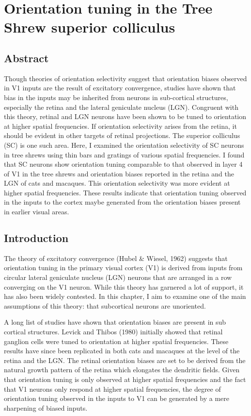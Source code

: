 
	\chapter{Orientation tuning in the Tree Shrew superior colliculus}
	\pagebreak
	\section{Abstract}
	
	Though theories of orientation selectivity suggest that orientation biases observed in V1 inputs are the result of excitatory convergence, studies have shown that bias in the inputs may be inherited from neurons in sub-cortical structures, especially the retina and the lateral geniculate nucleus (LGN). Congruent with this theory, retinal and LGN neurons have been shown to be tuned to orientation at higher spatial frequencies. If orientation selectivity arises from the retina, it should be evident in other targets of retinal projections. The superior colliculus (SC) is one such area. Here, I examined the orientation selectivity of SC neurons in tree shrews using thin bars and gratings of various spatial frequencies. I found that SC neurons show orientation tuning comparable to that observed in layer 4 of V1 in the tree shrews and orientation biases reported in the retina and the LGN of cats and macaques. This orientation selectivity was more evident at higher spatial frequencies. These results indicate that orientation tuning observed in the inputs to the cortex maybe generated from the orientation biases present in earlier visual areas.
	
	\pagebreak
	
	
	\section{Introduction}
	
	 The theory of excitatory convergence (Hubel \& Wiesel, 1962) suggests that orientation tuning in the primary visual cortex (V1) is derived from inputs from circular lateral geniculate nucleus (LGN) neurons that are arranged in a row converging on the V1 neuron. While this theory has garnered a lot of support, it has also been widely contested. In this chapter, I aim to examine one of the main assumptions of this theory: that subcortical neurons are unoriented.
	 
	 A long list of studies have shown that orientation biases are present in sub cortical structures. Levick and Thibos (1980) initially showed that retinal ganglion cells were tuned to orientation at higher spatial frequencies. These results have since been replicated in both cats and macaques at the level of the retina and the LGN. The retinal orientation biases are set to be derived from the natural growth pattern of the retina which elongates the dendritic fields. Given that orientation tuning is only observed at higher spatial frequencies and the fact that V1 neurons only respond at higher spatial frequencies, the degree of orientation tuning observed in the inputs to V1 can be generated by a mere sharpening of biased inputs.
	 	
